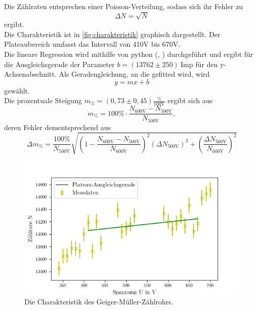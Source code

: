 Die Zählraten entsprechen einer Poisson-Verteilung, sodass sich ihr Fehler zu 
\begin{equation*}
  \Delta N = \sqrt{N}
\end{equation*}
ergibt.\\
Die Charakteristik ist in \autoref{fig:charakteristik} graphisch dargestellt.
Der Plateaubereich umfasst das Intervall von 410V bis 670V.\\
Die lineare Regression wird mithilfe von python (\cite{numpy}, \cite{uncertainties}) durchgeführt und ergibt
für die Ausgleichsgerade der Parameter $b = (13762 \pm 250)  \: \mathrm{Imp}$ für den y-Achsenabschnitt.
Als Geradengleichung, an die gefitted wird, wird 
\begin{equation*}
  y = mx + b
\end{equation*}
gewählt.\\
Die prozentuale Steigung $m_{\%} = (0,73 \pm 0,45) \mathrm{\frac{\%}{100 V}}$ ergibt sich aus 
\begin{equation*}
  m_{\%} = 100\% \cdot \frac{N_{\mathrm{600V}} - N_{\mathrm{500V}}}{N_{\mathrm{500V}}},
\end{equation*}
deren Fehler dementsprechend aus
\begin{equation*}
  \Delta m_{\%} = \frac{100\%}{N_{\mathrm{500V}}} \sqrt{(1 - \frac{N_{\mathrm{600V}} - N_{\mathrm{500V}}}{N_{\mathrm{600V}}})^2 (\Delta N_{\mathrm{500V}})^2 + (\frac{\Delta N_{\mathrm{500V}}}{N_{\mathrm{600V}}})^2}
\end{equation*}

\begin{figure}[H]
  \centering
  \includegraphics{content/fml.png}
  \caption{Die Charakteristik des Geiger-Müller-Zählrohrs.}
  \label{fig:charakteristik}
\end{figure}


